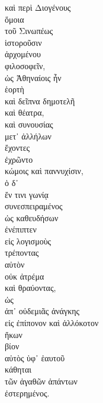 {\large
\begin{greek}
\noindent καὶ περὶ Διογένους \\
ὅμοια \\
\tabto{2em} τοῦ Σινωπέως \\
ἱστοροῦσιν \\
\tabto{2em} ἀρχομένου \\
\tabto{4em} φιλοσοφεῖν, \\
ὡς Ἀθηναίοις ἦν\\
\tabto{2em} ἑορτὴ \\
\tabto{2em} καὶ δεῖπνα δημοτελῆ \\
\tabto{2em} καὶ θέατρα, \\
καὶ συνουσίας \\
\tabto{2em} μετ᾽ ἀλλήλων \\
ἔχοντες \\
ἐχρῶντο \\
\tabto{2em} κώμοις καὶ παννυχίσιν, \\
ὁ δ᾽ \\
\tabto{2em} ἔν τινι γωνίᾳ \\
συνεσπειραμένος \\
\tabto{2em} ὡς καθευδήσων \\
ἐνέπιπτεν \\
\tabto{2em} εἰς λογισμοὺς\\
\tabto{4em} τρέποντας \\
\tabto{6em} αὐτὸν \\
\tabto{6em} οὐκ ἀτρέμα \\
\tabto{4em} καὶ θραύοντας, \\
\tabto{6em} ὡς \\
\tabto{8em} ἀπ᾽ οὐδεμιᾶς ἀνάγκης \\
\tabto{8em} εἰς ἐπίπονον καὶ ἀλλόκοτον\\
\tabto{6em} ἥκων\\
\tabto{8em} βίον \\
\tabto{6em} αὐτὸς ὑφ᾽ ἑαυτοῦ \\
\tabto{6em} κάθηται \\
\tabto{8em} τῶν ἀγαθῶν ἁπάντων \\
\tabto{6em} ἐστερημένος.\\

\end{greek}
}

